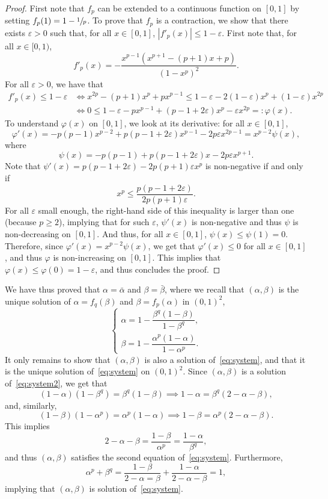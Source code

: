 \documentclass[10pt]{amsart}
\let \nicefrac\sfrac
\numberwithin{equation}{section}
\theoremstyle{definition}
\begin{document}
\begin{proof}
First note that $f_p$ can be extended to a continuous function on $[0,1]$ by setting $f_p(1) = 1-\nicefrac1p$. To prove that $f_p$ is a contraction, we show that there exists $\varepsilon>0$ such that, for all $x\in[0,1]$, $|f'_p(x)|\leq 1-\varepsilon$.
First note that, for all $x\in [0,1)$,
\[
f'_p(x) = -\frac{x^{p-1}(x^{p+1}-(p+1)x+{p})}{(1-x^p)^2}.
\]
For all $\varepsilon>0$, we have that
\begin{align*}
f'_p(x)\leq 1-\varepsilon
&\iff x^{2p}-(p+1)x^p +px^{p-1}
\leq 1-\varepsilon -2(1-\varepsilon)x^p+(1-\varepsilon) x^{2p}\\
&\iff 0\leq 1-\varepsilon - px^{p-1} + (p-1+2\varepsilon)x^p-\varepsilon x^{2p}
=:\varphi(x).
\end{align*}
To understand $\varphi(x)$ on $[0,1]$, we look at its derivative: for all $x\in [0,1]$,
\[
\varphi'(x)
= -p(p-1)x^{p-2}+p(p-1+2\varepsilon)x^{p-1}-2p\varepsilon x^{2p-1} = x^{p-2}\psi(x),
\]
where
\[
\psi(x) = -p(p-1)+p(p-1+2\varepsilon)x-2p\varepsilon x^{p+1}.
\]
Note that $\psi'(x) = p(p-1+2\varepsilon)-2p(p+1)\varepsilon x^p$ is non-negative if and only if
\[
x^p\leq \frac{p(p-1+2\varepsilon)}{2p(p+1)\varepsilon}.
\]
For all $\varepsilon$ small enough, the right-hand side of this inequality is larger than one (because $p\geq 2$), implying that for such $\varepsilon$, $\psi'(x)$ is non-negative and thus $\psi$ is non-decreasing on $[0,1]$.
And thus, for all $x\in [0,1]$, $\psi(x)\leq \psi(1) = 0$.
Therefore, since $\varphi'(x) = x^{p-2}\psi(x)$, we get that $\varphi'(x)\leq 0$ for all $x\in [0,1]$,
and thus $\varphi$ is non-increasing on $[0,1]$. This implies that
$\varphi(x)\leq \varphi(0) = 1-\varepsilon$, and thus concludes the proof.
\end{proof}

We have thus proved that $\alpha = \bar\alpha$ and $\beta = \bar\beta$,
where we recall that $(\alpha, \beta)$ is the unique solution of $\alpha = f_q(\beta)$ and $\beta = f_p(\alpha)$ in $(0,1)^2$, \ie
\begin{equation}\label{eq:system2}
\begin{cases}
\alpha = 1-\dfrac{\beta^q(1-\beta)}{1-\beta^q},\\[5pt]
\beta = 1-\dfrac{\alpha^p(1-\alpha)}{1-\alpha^p}.
\end{cases}
\end{equation}
It only remains to show that $(\alpha,\beta)$ is also {a} solution of~\eqref{eq:system},
and that it is the unique solution of~\eqref{eq:system} on $(0,1)^2$.
Since $(\alpha,\beta)$ is {a} solution of~\eqref{eq:system2}, we get that
\[
(1-\alpha)(1-\beta^q) =\beta^q(1-\beta)
\implies 1-\alpha=\beta^q(2-\alpha-\beta),
\]
and, similarly,
\[
(1-\beta)(1-\alpha^p) =\alpha^p(1-\alpha)
\implies 1-\beta=\alpha^p(2-\alpha-\beta).
\]
This implies
\[
2-\alpha-\beta = \frac{1-\beta}{\alpha^p} = \frac{1-\alpha}{\beta^q},
\]
and thus $(\alpha,\beta)$ satisfies the second equation of~\eqref{eq:system}.
Furthermore,
\[
\alpha^p+\beta^q = \frac{1-\beta}{2-\alpha=\beta} + \frac{1-\alpha}{2-\alpha-\beta} = 1,
\]
implying that $(\alpha,\beta)$ is solution of~\eqref{eq:system}.
\end{document}
